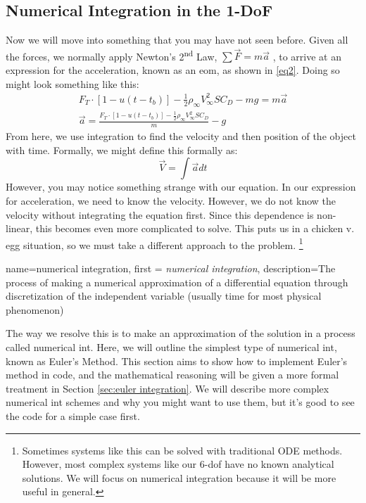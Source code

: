\documentclass[12pt]{report}
\begin{document}
\subsection{Numerical Integration in the 1-DoF}\label{sec: Numerical Integration in the 1DoF}
Now we will move into something that you may have not seen before. Given all the forces, we normally apply Newton’s 2\textsuperscript{nd} Law, $\sum{\vec{F}}=m\vec{a}$ , to arrive at an expression for the acceleration, known as an \gls{eom}, as shown in \eqref{eq2}. Doing so might look something like this:
\begin{gather}
F_T \cdot [1-u(t-t_b)]-\frac{1}{2}\rho_{\infty}V_{\infty}^2SC_D-mg=m\vec{a}\label{eq1} \\
\vec{a}=\frac{F_T \cdot [1-u(t-t_b)]-\frac{1}{2}\rho_{\infty}V_{\infty}^2SC_D}{m}-g\label{eq2}
\end{gather}
 From here, we use integration to find the velocity and then position of the object with time. Formally, we might define this formally as:
 $$\vec{V}=\int{\vec{a}}{dt}$$
However, you may notice something strange with our equation. In our expression for acceleration, we need to know the velocity. However, we do not know the velocity without integrating the equation first. Since this dependence is non-linear, this becomes even more complicated to solve. This puts us in a chicken v. egg situation, so we must take a different approach to the problem. \footnote{Sometimes systems like this can be solved with traditional ODE methods. However, most complex systems like our 6-\gls{dof} have no known analytical solutions. We will focus on numerical integration because it will be more useful in general. }

{
    name=numerical integration,
    first = {\textit{numerical integration}},
    description={The process of making a numerical approximation of a differential equation through discretization of the independent variable (usually time for most physical phenomenon)}
}

The way we resolve this is to make an approximation of the solution in a process called \gls{numerical int}. Here, we will outline the simplest type of \gls{numerical int}, known as Euler’s Method. This section aims to show how to implement Euler’s method in code, and the mathematical reasoning will be given a more formal treatment in Section \ref{sec:euler integration}. We will describe more complex \gls{numerical int} schemes and why you might want to use them, but it’s good to see the code for a simple case first.
\end{document}
